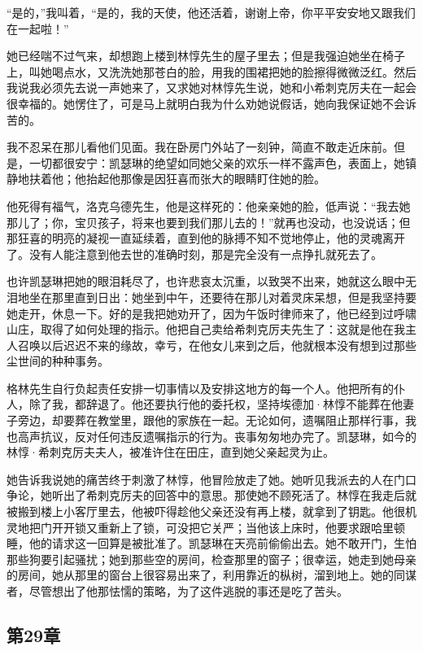 \par “是的，”我叫着，“是的，我的天使，他还活着，谢谢上帝，你平平安安地又跟我们在一起啦！”
\par 她已经喘不过气来，却想跑上楼到林惇先生的屋子里去；但是我强迫她坐在椅子上，叫她喝点水，又洗洗她那苍白的脸，用我的围裙把她的脸擦得微微泛红。然后我说我必须先去说一声她来了，又求她对林惇先生说，她和小希刺克厉夫在一起会很幸福的。她愣住了，可是马上就明白我为什么劝她说假话，她向我保证她不会诉苦的。
\par 我不忍呆在那儿看他们见面。我在卧房门外站了一刻钟，简直不敢走近床前。但是，一切都很安宁：凯瑟琳的绝望如同她父亲的欢乐一样不露声色，表面上，她镇静地扶着他；他抬起他那像是因狂喜而张大的眼睛盯住她的脸。
\par 他死得有福气，洛克乌德先生，他是这样死的：他亲亲她的脸，低声说：“我去她那儿了；你，宝贝孩子，将来也要到我们那儿去的！”就再也没动，也没说话；但那狂喜的明亮的凝视一直延续着，直到他的脉搏不知不觉地停止，他的灵魂离开了。没有人能注意到他去世的准确时刻，那是完全没有一点挣扎就死去了。
\par 也许凯瑟琳把她的眼泪耗尽了，也许悲哀太沉重，以致哭不出来，她就这么眼中无泪地坐在那里直到日出：她坐到中午，还要待在那儿对着灵床呆想，但是我坚持要她走开，休息一下。好的是我把她劝开了，因为午饭时律师来了，他已经到过呼啸山庄，取得了如何处理的指示。他把自己卖给希刺克厉夫先生了：这就是他在我主人召唤以后迟迟不来的缘故，幸亏，在他女儿来到之后，他就根本没有想到过那些尘世间的种种事务。
\par 格林先生自行负起责任安排一切事情以及安排这地方的每一个人。他把所有的仆人，除了我，都辞退了。他还要执行他的委托权，坚持埃德加·林惇不能葬在他妻子旁边，却要葬在教堂里，跟他的家族在一起。无论如何，遗嘱阻止那样行事，我也高声抗议，反对任何违反遗嘱指示的行为。丧事匆匆地办完了。凯瑟琳，如今的林惇·希刺克厉夫夫人，被准许住在田庄，直到她父亲起灵为止。
\par 她告诉我说她的痛苦终于刺激了林惇，他冒险放走了她。她听见我派去的人在门口争论，她听出了希刺克厉夫的回答中的意思。那使她不顾死活了。林惇在我走后就被搬到楼上小客厅里去，他被吓得趁他父亲还没有再上楼，就拿到了钥匙。他很机灵地把门开开锁又重新上了锁，可没把它关严；当他该上床时，他要求跟哈里顿睡，他的请求这一回算是被批准了。凯瑟琳在天亮前偷偷出去。她不敢开门，生怕那些狗要引起骚扰；她到那些空的房间，检查那里的窗子；很幸运，她走到她母亲的房间，她从那里的窗台上很容易出来了，利用靠近的枞树，溜到地上。她的同谋者，尽管想出了他那怯懦的策略，为了这件逃脱的事还是吃了苦头。


\subsection{第29章}

